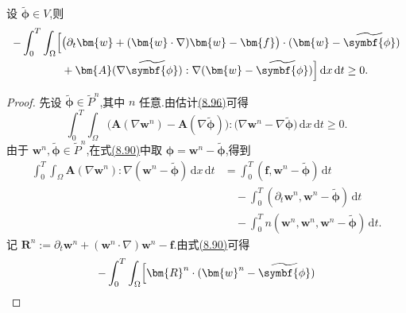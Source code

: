 \begin{lemma}[两个试验函数的弱方程之差的估计]
\label{lem:smagorinsky-weak-equation-difference-estimate}
设 $\widetilde{\symbf{\phi}}\in V$,则
\begin{equation}\label{eq:smagorinsky-weak-equation-difference}
\begin{aligned}
 -\int_0^T\int_\Omega\Bigl[&
  \bigl(\partial_t\bm{w}
       +(\bm{w}\cdot\nabla)\bm{w}-\bm{f}\bigr)
       \cdot(\bm{w}-\widetilde{\symbf{\phi}})\\
 &+\bm{A}(\nabla\widetilde{\symbf{\phi}})
       :\nabla(\bm{w}-\widetilde{\symbf{\phi}})\Bigr]
                     \,\mathrm{d}x\,\mathrm{d}t\ge0.
\end{aligned}
\end{equation}
\begin{proof}
先设 $\widetilde{\symbf{\phi}}\in\widetilde{P}^n$,其中 $n$ 任意.由估计\hyperref[eq:smagorinsky-operator-monotonicity]{(8.96)}可得
\begin{equation}\label{eq:smagorinsky-integrated-monotonicity}
 \int_0^T\int_\Omega
  \bigl(\bm{A}(\nabla\bm{w}^n)
       -\bm{A}(\nabla\widetilde{\symbf{\phi}})\bigr)
  :\bigl(\nabla\bm{w}^n
       -\nabla\widetilde{\symbf{\phi}}\bigr)
                       \,\mathrm{d}x\,\mathrm{d}t\ge0.
\end{equation}
由于 $\bm{w}^n,\widetilde{\symbf{\phi}}\in\widetilde{P}^n$,在式\hyperref[eq:smagorinsky-galerkin-integrated-test]{(8.90)}中取
$\symbf{\phi}=\bm{w}^n-\widetilde{\symbf{\phi}}$,得到
\[
\begin{aligned}
 \int_0^T\int_\Omega
      \bm{A}(\nabla\bm{w}^n):
          \nabla(\bm{w}^n-\widetilde{\symbf{\phi}})
                              \,\mathrm{d}x\,\mathrm{d}t
 &=\int_0^T(\bm{f},\bm{w}^n-\widetilde{\symbf{\phi}})
                                          \,\mathrm{d}t\\
 &\quad-\int_0^T(\partial_t\bm{w}^n,
            \bm{w}^n-\widetilde{\symbf{\phi}})\,\mathrm{d}t\\
 &\quad-\int_0^T n(\bm{w}^n,\bm{w}^n,
            \bm{w}^n-\widetilde{\symbf{\phi}})\,\mathrm{d}t.
\end{aligned}
\]
记 $\bm{R}^n:=\partial_t\bm{w}^n
 +(\bm{w}^n\cdot\nabla)\bm{w}^n-\bm{f}$.由式\hyperref[eq:smagorinsky-galerkin-integrated-test]{(8.90)}可得
\begin{equation}\label{eq:smagorinsky-weak-equation-difference-finite-n}
\begin{aligned}
 -\int_0^T\int_\Omega\Bigl[
  \bm{R}^n\cdot(\bm{w}^n-\widetilde{\symbf{\phi}})\\

\end{aligned}
\end{equation}
\end{proof}
\end{lemma}
